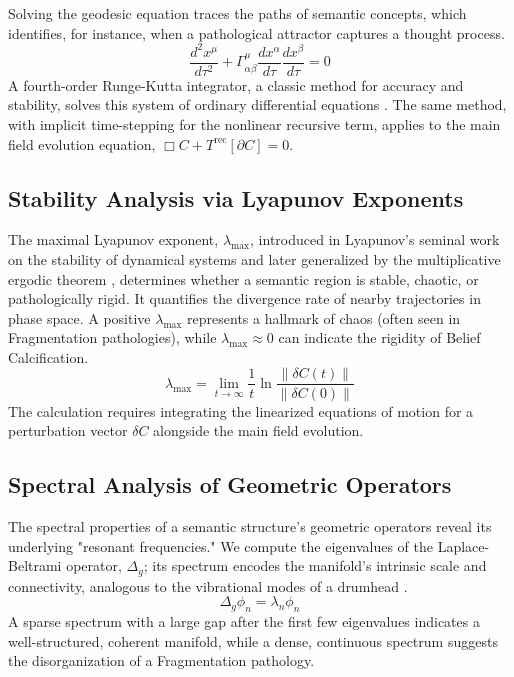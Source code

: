 Solving the geodesic equation traces the paths of semantic concepts, which identifies, for instance, when a pathological attractor captures a thought process.
\begin{equation}
\frac{d^2 x^{\mu}}{d\tau^2} + \Gamma^{\mu}_{\alpha\beta} \frac{dx^{\alpha}}{d\tau} \frac{dx^{\beta}}{d\tau} = 0
\end{equation}
A fourth-order Runge-Kutta integrator, a classic method for accuracy and stability, solves this system of ordinary differential equations \autocite{Runge1895, Kutta1901}. The same method, with implicit time-stepping for the nonlinear recursive term, applies to the main field evolution equation, \(\Box C + T^{\text{rec}}[\partial C] = 0\).

\subsection{Stability Analysis via Lyapunov Exponents}

The maximal Lyapunov exponent, \(\lambda_{\max}\), introduced in Lyapunov's seminal work on the stability of dynamical systems and later generalized by the multiplicative ergodic theorem \autocite{Lyapunov1907, Oseledets1968}, determines whether a semantic region is stable, chaotic, or pathologically rigid. It quantifies the divergence rate of nearby trajectories in phase space. A positive \(\lambda_{\max}\) represents a hallmark of chaos (often seen in Fragmentation pathologies), while \(\lambda_{\max} \approx 0\) can indicate the rigidity of Belief Calcification.
\begin{equation}
\lambda_{\max} = \lim_{t \to \infty} \frac{1}{t} \ln \frac{\|\delta C(t)\|}{\|\delta C(0)\|}
\end{equation}
The calculation requires integrating the linearized equations of motion for a perturbation vector \(\delta C\) alongside the main field evolution.

\subsection{Spectral Analysis of Geometric Operators}

The spectral properties of a semantic structure's geometric operators reveal its underlying "resonant frequencies." We compute the eigenvalues of the Laplace-Beltrami operator, \(\Delta_g\); its spectrum encodes the manifold's intrinsic scale and connectivity, analogous to the vibrational modes of a drumhead \autocite{Chung1997}.
\begin{equation}
\Delta_g \phi_n = \lambda_n \phi_n
\end{equation}
A sparse spectrum with a large gap after the first few eigenvalues indicates a well-structured, coherent manifold, while a dense, continuous spectrum suggests the disorganization of a Fragmentation pathology.

